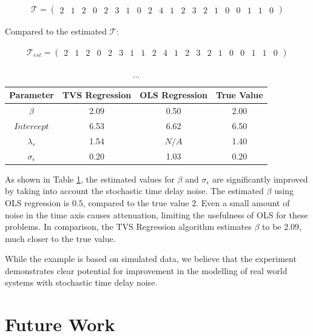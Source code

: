 \documentclass[11pt]{amsart}
\theoremstyle{definition}
\theoremstyle{definition}
\begin{document}
\begin{align}
\mathcal{T} = 
\left(
\begin{array}{cccccccccccccccccccc}
2 & 1 & 2 & 0 & 2 & 3 & 1 & 0 & 2 & 4 & 1 & 2 & 3 & 2 & 1 & 0  & 0 & 1 & 1 & 0 
\end{array}  
\right)
\end{align}
\newline

Compared to the estimated $\mathcal{T}$:

\begin{align}
\mathcal{T}_{est} = 
\left(
\begin{array}{cccccccccccccccccccc}   
2 & 1 & 2 & 0 & 2 & 3 & 1 & 1 & 2 & 4 & 1 & 2 & 3 & 2 & 1 & 0  & 0 & 1 & 1 & 0 
\end{array}  
\right)
\end{align}



\begin{center}
\begin{table}
\begin{tabular}{c|c|c|c|}
\hline
Parameter & TVS Regression & OLS Regression & True Value \\
\hline
$\beta$ & 2.09 & 0.50 & 2.00  \\
\hline
$Intercept$ & 6.53 & 6.62 & 6.50 \\
\hline
$\lambda_{\tau}$ & 1.54 & $N/A$ & 1.40 \\
\hline
$\sigma_{\epsilon}$ & 0.20 & 1.03 & 0.20 \\
\end{tabular}
\caption{ ... } 
\label{results_table}
\end{table}
\end{center}

As shown in Table \ref{results_table}, the estimated values for $\beta$ and $\sigma_{\epsilon}$ are significantly improved by taking into account the stochastic time delay noise. The estimated $\beta$ using OLS regression is $0.5$, compared to the true value $2$. Even a small amount of noise in the time axis causes attenuation, 
limiting the usefulness of OLS for these problems.
In comparison, the TVS Regression algorithm estimates $\beta$ to be $2.09$, much closer to the true value.

While the example is based on simulated data, we believe that the experiment demonstrates clear potential for improvement in the modelling of real world systems with stochastic time delay noise.


\section{Future Work}
\end{document}
